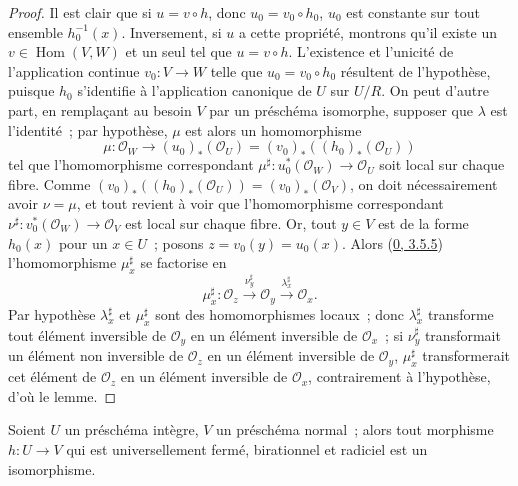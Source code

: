 \begin{proof}
Il est clair que si $u=v\circ h$, donc $u_0=v_0\circ h_0$, $u_0$ est
constante sur tout ensemble $h_0^{-1}(x)$. Inversement, si $u$ a cette
propriété, montrons qu'il existe un $v\in\operatorname{Hom}(V,W)$ et un seul
tel que $u=v\circ h$. L'existence et l'unicité de l'application continue
$v_0:V\to W$ telle que $u_0=v_0\circ h_0$ résultent de l'hypothèse, puisque
$h_0$ s'identifie à l'application canonique de $U$ sur $U/R$. On peut d'autre
part, en remplaçant au besoin $V$ par un préschéma isomorphe, supposer que
$\lambda$ est l'identité~; par hypothèse, $\mu$ est alors un homomorphisme
\[
  \mu:\mathcal{O}_W\longrightarrow(u_0)_*(\mathcal{O}_U)
  =(v_0)_*((h_0)_*(\mathcal{O}_U))
\]
tel que l'homomorphisme correspondant
$\mu^\sharp:u_0^*(\mathcal{O}_W)\to\mathcal{O}_U$ soit local sur chaque
fibre. Comme
$(v_0)_*((h_0)_*(\mathcal{O}_U))=(v_0)_*(\mathcal{O}_V)$, on doit
nécessairement avoir $\nu=\mu$, et tout revient à voir que l'homomorphisme
correspondant $\nu^\sharp:v_0^*(\mathcal{O}_W)\to\mathcal{O}_V$ est local sur
chaque fibre. Or, tout $y\in V$ est de la forme $h_0(x)$ pour un $x\in U$~;
posons $z=v_0(y)=u_0(x)$. Alors
(\hyperref[0.3.5.5-fr]{0, 3.5.5}) l'homomorphisme $\mu_x^\sharp$ se factorise
en
\[
  \mu_x^\sharp:\mathcal{O}_z
  \xrightarrow{\nu_y^\sharp}\mathcal{O}_y
  \xrightarrow{\lambda_x^\sharp}\mathcal{O}_x.
\]
Par hypothèse $\lambda_x^\sharp$ et $\mu_x^\sharp$ sont des homomorphismes
locaux~; donc $\lambda_x^\sharp$ transforme tout élément inversible de
$\mathcal{O}_y$ en un élément inversible de $\mathcal{O}_x$~; si
$\nu_y^\sharp$ transformait un élément non inversible de $\mathcal{O}_z$ en
un élément inversible de $\mathcal{O}_y$, $\mu_x^\sharp$ transformerait cet
élément de $\mathcal{O}_z$ en un élément inversible de $\mathcal{O}_x$,
contrairement à l'hypothèse, d'où le lemme.
\end{proof}

\begin{corollary}[8.11.2]
\label{II.8.11.2-fr}
Soient $U$ un préschéma intègre, $V$ un préschéma normal~; alors tout morphisme
$h:U\to V$ qui est universellement fermé, birationnel et radiciel est un
isomorphisme.
\end{corollary}

